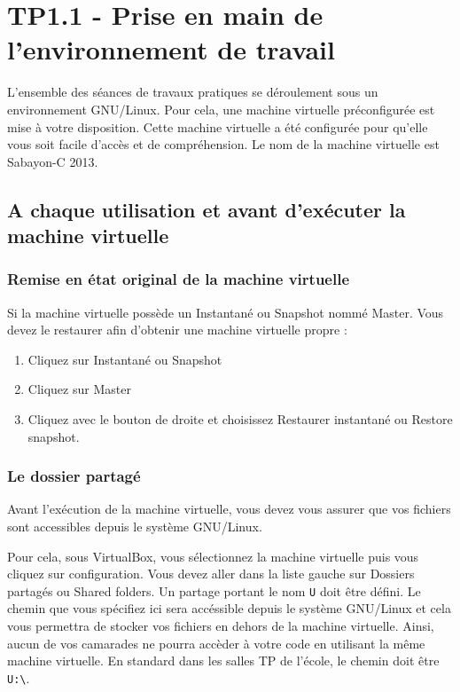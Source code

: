 \chapter{TP1.1 - Prise en main de l'environnement de travail}

L'ensemble des séances de travaux pratiques se déroulement sous un environnement GNU/Linux. Pour cela, une machine virtuelle préconfigurée est mise à votre disposition.
Cette machine virtuelle a été configurée pour qu'elle vous soit facile d'accès et de compréhension. Le nom de la machine virtuelle est \og{}Sabayon-C 2013\fg{}.

\section{A chaque utilisation et avant d'exécuter la machine virtuelle}

\subsection{Remise en état original de la machine virtuelle}

Si la machine virtuelle possède un \og{}Instantané\fg{} ou \og{}Snapshot\fg{} nommé \og{}Master\fg{}. Vous devez le restaurer afin d'obtenir une machine virtuelle propre :
\begin{enumerate}
  \item Cliquez sur \og{}Instantané\fg{} ou \og{}Snapshot\fg{}
  \item Cliquez sur \og{}Master\fg{}
  \item Cliquez avec le bouton de droite et choisissez \og{}Restaurer instantané\fg{} ou \og{}Restore snapshot\fg{}.
\end{enumerate}

\begin{center}
\end{center}

\subsection{Le dossier partagé}

Avant l'exécution de la machine virtuelle, vous devez vous assurer que vos fichiers sont accessibles depuis le système GNU/Linux.

Pour cela, sous VirtualBox, vous sélectionnez la machine virtuelle puis vous cliquez sur configuration. Vous devez aller dans la liste gauche sur \og{}Dossiers partagés\fg{} ou \og{}Shared folders\fg{}. Un partage portant le nom \og{}\verb-U-\fg{} doit être défini. Le chemin que vous spécifiez ici sera accéssible depuis le système GNU/Linux et cela vous permettra de stocker vos fichiers en dehors de la machine virtuelle. Ainsi, aucun de vos camarades ne pourra accèder à votre code en utilisant la même machine virtuelle. En standard dans les salles TP de l'école, le chemin doit être \og{}\verb-U:\-\fg{}.

